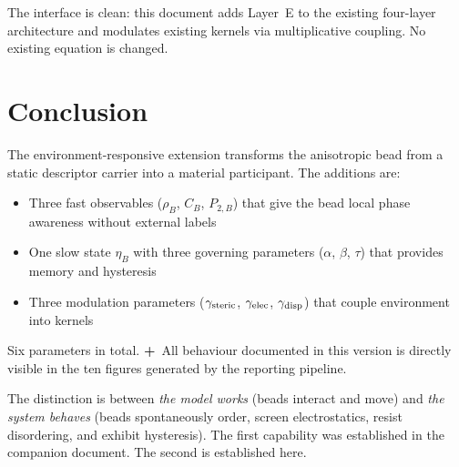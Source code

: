 \documentclass[11pt]{article}
\newcommand{\vsadd}[1]{\textcolor{vsgreen}{\textbf{+}~#1}}
\begin{document}
The interface is clean: this document adds Layer~E to the existing
four-layer architecture and modulates existing kernels via multiplicative
coupling.  No existing equation is changed.

\section{Conclusion}

The environment-responsive extension transforms the anisotropic bead from a
static descriptor carrier into a material participant.  The additions are:
\begin{itemize}
  \item Three fast observables ($\rho_B$, $C_B$, $P_{2,B}$) that give the
		bead local phase awareness without external labels
  \item One slow state $\eta_B$ with three governing parameters ($\alpha$,
		$\beta$, $\tau$) that provides memory and hysteresis
  \item Three modulation parameters ($\gamma_{\rm steric}$, $\gamma_{\rm
		elec}$, $\gamma_{\rm disp}$) that couple environment into kernels
\end{itemize}

Six parameters in total.  \vsadd{All behaviour documented in this version
is directly visible in the ten figures generated by the reporting pipeline.}

\medskip
\noindent
The distinction is between \emph{the model works} (beads interact and move)
and \emph{the system behaves} (beads spontaneously order, screen
electrostatics, resist disordering, and exhibit hysteresis).  The first
capability was established in the companion document.  The second is
established here.
\end{document}
